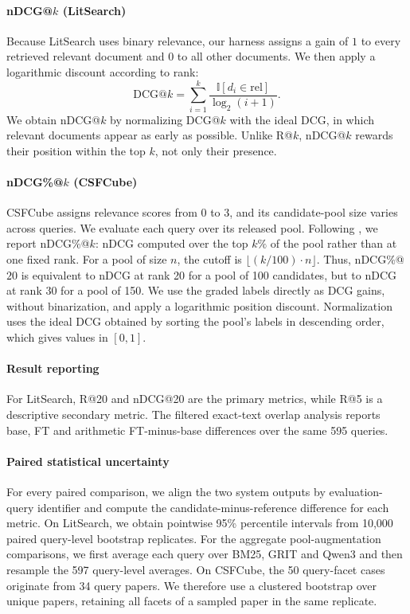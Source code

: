\documentclass[pdflatex,sn-basic,Numbered]{sn-jnl}%
\theoremstyle{thmstyleone}%
\theoremstyle{thmstyletwo}%
\theoremstyle{thmstylethree}%
\begin{document}
\paragraph{nDCG@$k$ (LitSearch)} Because LitSearch uses binary relevance, our
harness assigns a gain of $1$ to every retrieved relevant document and $0$ to all
other documents. We then apply a logarithmic discount according to rank:
\[
\mathrm{DCG@}k = \sum_{i=1}^{k}
\frac{\mathbb{I}[d_i \in \mathrm{rel}]}{\log_2(i+1)}.
\]
We obtain nDCG@$k$ by normalizing DCG@$k$ with the ideal DCG, in which
relevant documents appear as early as possible. Unlike R@$k$, nDCG@$k$ rewards
their position within the top $k$, not only their presence.

\paragraph{nDCG\%@$k$ (CSFCube)} CSFCube assigns relevance scores from 0 to 3,
and its candidate-pool size varies across queries. We evaluate each query over its
released pool. Following \cite{Mysore}, we report nDCG\%@$k$: nDCG computed
over the top $k\%$ of the pool rather than at one fixed rank. For a pool of size
$n$, the cutoff is $\lfloor (k/100) \cdot n \rfloor$. Thus, nDCG\%@$20$ is
equivalent to nDCG at rank 20 for a pool of 100 candidates, but to nDCG at rank
30 for a pool of 150. We use the graded labels directly as DCG gains, without
binarization, and apply a logarithmic position discount. Normalization uses the
ideal DCG obtained by sorting the pool's labels in descending order, which gives
values in $[0,1]$.

\paragraph{Result reporting} For LitSearch, R@20 and nDCG@20 are the primary
metrics, while R@5 is a descriptive secondary metric. The filtered
exact-text overlap analysis reports base, FT and arithmetic FT-minus-base
differences over the same 595 queries.

\paragraph{Paired statistical uncertainty} For every paired comparison, we align
the two system outputs by evaluation-query identifier and compute the
candidate-minus-reference difference for each metric. On LitSearch, we obtain
pointwise 95\% percentile intervals from 10,000 paired query-level bootstrap
replicates. For the aggregate pool-augmentation comparisons, we first average
each query over BM25, GRIT and Qwen3 and then resample the 597 query-level
averages. On CSFCube, the 50 query-facet cases originate from 34 query papers.
We therefore use a clustered bootstrap over unique papers, retaining all facets
of a sampled paper in the same replicate.
\end{document}
